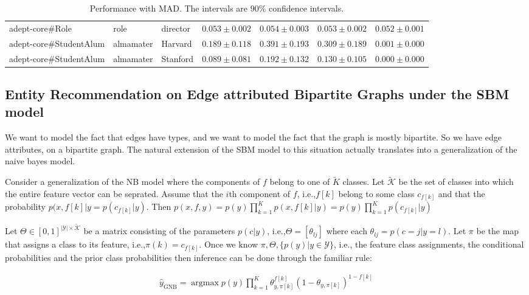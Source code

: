 \documentclass[paper=a4,fontsize=11pt]{scrartcl}
\newcommand{\ie}{i.e.,\xspace}
\newcommand{\argmax}[1]{\underset{#1}{\operatorname*{argmax}}}
\numberwithin{equation}{section}    %
\numberwithin{figure}{section}      %
\numberwithin{table}{section}       %
\begin{document}
\begin{table}[htbp]
{\begin{tabular}{l l l | c c c c}
adept-core#Role                 & role         & director        & $0.053 \pm 0.002 $ & $0.054 \pm 0.003 $ & $0.053 \pm 0.002 $ & $0.052 \pm 0.001 $\\
adept-core#StudentAlum          & almamater    & Harvard         & $0.189 \pm 0.118 $ & $0.391 \pm 0.193 $ & $0.309 \pm 0.189 $ & $0.001 \pm 0.000 $\\
adept-core#StudentAlum          & almamater    & Stanford        & $0.089 \pm 0.081 $ & $0.192 \pm 0.132 $ & $0.130 \pm 0.105 $ & $0.000 \pm 0.000 $\\
\end{tabular}}
  \caption{Performance with MAD. The intervals are 90\% confidence intervals.}
  \label{tab:perf-nb}
\end{table}


\subsection{Entity Recommendation on Edge attributed Bipartite Graphs under the SBM model}
\label{sec:er-vn}
We want to model the fact that edges have types, and we want to model the fact that
the graph is mostly bipartite. So we have edge attributes, on a bipartite graph.
The natural extension of the SBM model to this situation actually translates
into a generalization of the naive bayes model.

Consider a generalization of the NB model where the components of $f$ belong to
one of $\tilde{K}$ classes. Let $\mathcal{\tilde{K}}$ be the set of classes into
which the entire feature vector can be seprated. Assume that the $i$th component
of $f$, \ie $f[k]$ belong to some class $c_{f[k]}$ and that the probability
$p(x, f[k] | y = p(c_{f[k]} | y)$. Then $p(x, f, y) = p(y) \prod_{k=1}^K p(x,
f[k] | y) = p(y) \prod_{k=1}^K p(c_{f[k]} | y)$

Let $\Theta \in [0, 1]^{|\mathcal{Y}| \times \mathcal{\tilde{K}}}$ be a matrix
consisting of the parameters $p(c | y)$, \ie $\Theta = [\theta_{lj}]$ where
each $\theta_{lj} = p(c=j | y=l)$. Let $\pi$ be the map that assigns a class to
its feature, \ie $\pi(k) = c_{f[k]}$. Once we know
$\pi, \Theta, \{p(y) | y \in \mathcal{Y}\}$, \ie the
feature class assignments, the conditional probabilities and the prior class
probabilities  then inference can be done through the familiar rule:

\begin{align}
  \hat{y}_{\mathrm{GNB}} = \argmax{} p(y) \prod_{k=1}^K \theta_{y, \pi[k]}^{f[k]}
  (1 - \theta_{y, \pi[k]})^{1-f[k]}
\end{align}
\end{document}
